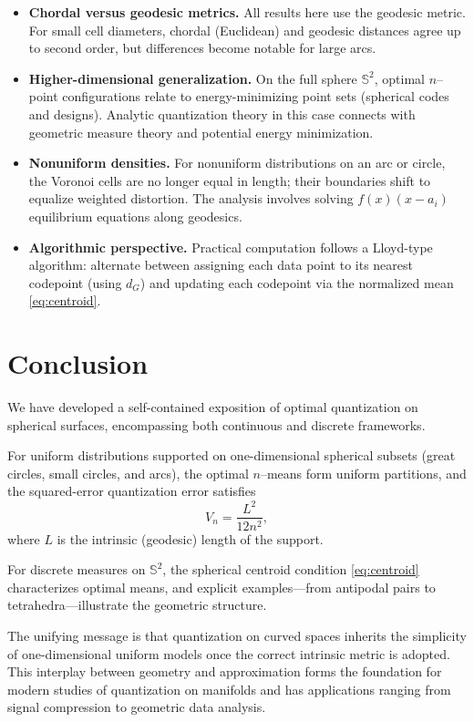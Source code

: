 \documentclass[12pt, reqno]{amsart}
\theoremstyle{plain}
\theoremstyle{definition}
\newcommand{\D}[1]{\mathbb{#1}}%
\begin{document}
\begin{itemize}
\item \textbf{Chordal versus geodesic metrics.}  
All results here use the geodesic metric. For small cell diameters, chordal (Euclidean) and geodesic distances agree up to second order, but differences become notable for large arcs.

\item \textbf{Higher-dimensional generalization.}  
On the full sphere $\D S^2$, optimal $n$--point configurations relate to energy-minimizing point sets (spherical codes and designs). Analytic quantization theory in this case connects with geometric measure theory and potential energy minimization.

\item \textbf{Nonuniform densities.}  
For nonuniform distributions on an arc or circle, the Voronoi cells are no longer equal in length; their boundaries shift to equalize weighted distortion. The analysis involves solving $f(x)(x-a_i)$ equilibrium equations along geodesics.

\item \textbf{Algorithmic perspective.}  
Practical computation follows a Lloyd-type algorithm: alternate between assigning each data point to its nearest codepoint (using $d_G$) and updating each codepoint via the normalized mean \eqref{eq:centroid}.
\end{itemize}

\section{Conclusion}

We have developed a self-contained exposition of optimal quantization on spherical surfaces, encompassing both continuous and discrete frameworks.

For uniform distributions supported on one-dimensional spherical subsets (great circles, small circles, and arcs), the optimal $n$--means form uniform partitions, and the squared-error quantization error satisfies
\[
V_n = \frac{L^2}{12n^2},
\]
where $L$ is the intrinsic (geodesic) length of the support.

For discrete measures on $\D S^2$, the spherical centroid condition \eqref{eq:centroid} characterizes optimal means, and explicit examples---from antipodal pairs to tetrahedra---illustrate the geometric structure.

The unifying message is that quantization on curved spaces inherits the simplicity of one-dimensional uniform models once the correct intrinsic metric is adopted. This interplay between geometry and approximation forms the foundation for modern studies of quantization on manifolds and has applications ranging from signal compression to geometric data analysis.
\end{document}
